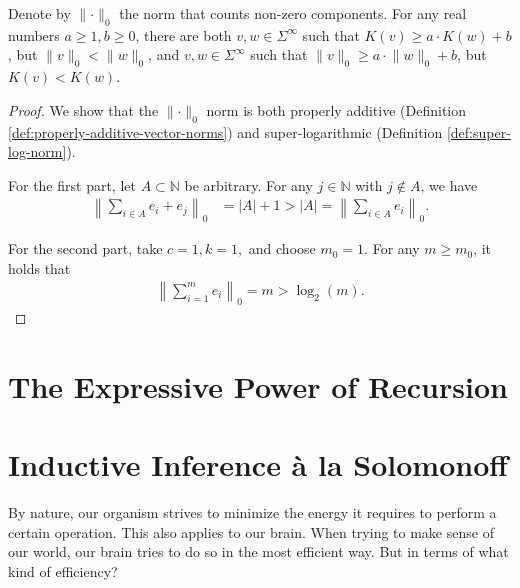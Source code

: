 \begin{corollary}
	Denote by $\lVert\cdot\rVert_0$ the norm that counts non-zero components.
	For any real numbers $a\geq 1, b\geq 0$, there are both $v,w\in\Sigma^{\infty}$ such that $K(v)\geq a\cdot K(w)+b$, but $\lVert v \rVert_0 < \lVert w \rVert_0 $, and $v,w\in\Sigma^{\infty}$ such that $\lVert v \rVert_0 \geq a\cdot \lVert w \rVert_0+b$, but $K(v) < K(w)$. 
\end{corollary}
\begin{proof}
	We show that the $\lVert\cdot\rVert_0$ norm is both properly additive (Definition \ref{def:properly-additive-vector-norms}) and super-logarithmic (Definition \ref{def:super-log-norm}).
	
	For the first part, let $A\subset \mathbb{N}$ be arbitrary.
	For any $j\in\mathbb{N}$ with $j\notin A$, we have
	\begin{align}
		\left\lVert \sum_{i\in A} e_i + e_j \right\rVert_0 &= |A|+1 > |A| = \left\lVert \sum_{i\in A} e_i \right\rVert_0.
	\end{align}
	
	For the second part, take $c=1,k=1,$ and choose $m_0=1$. For any $m\geq m_0$, it holds that
	\begin{align}
		\left\lVert \sum_{i=1}^{m} e_i \right\rVert_0 = m > \log_2(m).
	\end{align}
\end{proof}


\section{The Expressive Power of Recursion}

\section{Inductive Inference à la Solomonoff}
By nature, our organism strives to minimize the energy it requires to perform a certain operation. This also applies to our brain. When trying to make sense of our world, our brain tries to do so in the most efficient way. But in terms of what kind of efficiency?

